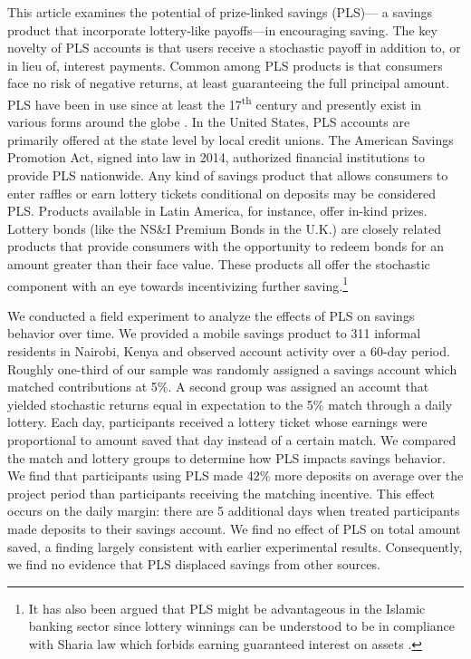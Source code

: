 \documentclass[12pt]{article}
\begin{document}
	This article examines the potential of prize-linked savings (PLS)--- a savings product that incorporate lottery-like payoffs---in encouraging saving. The key novelty of PLS accounts is that users receive a stochastic payoff in addition to, or in lieu of, interest payments. Common among PLS products is that consumers face no risk of negative returns, at least guaranteeing the full principal amount. PLS have been in use since at least the 17\textsuperscript{th} century and presently exist in various forms around the globe \parencite{murphy_lotteries_2005,kearney_making_2010}. In the United States, PLS accounts are primarily offered at the state level by local credit unions. The American Savings Promotion Act, signed into law in 2014, authorized financial institutions to provide PLS nationwide. Any kind of savings product that allows consumers to enter raffles or earn lottery tickets conditional on deposits may be considered PLS. Products available in Latin America, for instance, offer in-kind prizes. Lottery bonds (like the NS\&I Premium Bonds in the U.K.) are closely related products that provide consumers with the opportunity to redeem bonds for an amount greater than their face value. These products all offer the stochastic component with an eye towards incentivizing further saving.\footnote{It has also been argued that PLS might be advantageous in the Islamic banking sector since lottery winnings can be understood to be in compliance with Sharia law which forbids earning guaranteed interest on assets \parencite{ruth_how_2018}.}

	We conducted a field experiment to analyze the effects of PLS on savings behavior over time. We provided a mobile savings product to 311 informal residents in Nairobi, Kenya and observed account activity over a 60-day period. Roughly one-third of our sample was randomly assigned a savings account which matched contributions at 5\%. A second group was assigned an account that yielded stochastic returns equal in expectation to the 5\% match through a daily lottery. Each day, participants received a lottery ticket whose earnings were proportional to amount saved that day instead of a certain match. We compared the match and lottery groups to determine how PLS impacts savings behavior. We find that participants using PLS made 42\% more deposits on average over the project period than participants receiving the matching incentive. This effect occurs on the daily margin: there are 5 additional days when treated participants made deposits to their savings account. We find no effect of PLS on total amount saved, a finding largely consistent with earlier experimental results. Consequently, we find no evidence that PLS displaced savings from other sources. 
\end{document}
